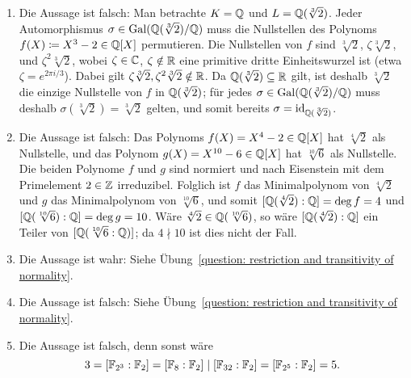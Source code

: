 \begin{solution}
  \begin{enumerate}
    \item
      Die Aussage ist falsch:
      Man betrachte $K = \mathbb{Q}$ und $L = \mathbb{Q}(\sqrt[3]{2})$.
      Jeder Automorphismus $\sigma \in \operatorname{Gal}(\mathbb{Q}(\sqrt[3]{2})/\mathbb{Q})$ muss die Nullstellen des Polynoms $f(X) \coloneqq X^3-2 \in \mathbb{Q}[X]$ permutieren.
      Die Nullstellen von $f$ sind $\sqrt[3]{2}$, $\zeta \sqrt[3]{2}$, und $\zeta^2 \sqrt[3]{2}$, wobei $\zeta \in \mathbb{C}$, $\zeta \notin \mathbb{R}$ eine primitive dritte Einheitswurzel ist (etwa $\zeta = e^{2 \pi i/3}$).
      Dabei gilt $\zeta \sqrt[3]{2}, \zeta^2 \sqrt[3]{2} \notin \mathbb{R}$.
      Da $\mathbb{Q}(\sqrt[3]{2}) \subseteq \mathbb{R}$ gilt, ist deshalb $\sqrt[3]{2}$ die einzige Nullstelle von $f$ in $\mathbb{Q}(\sqrt[3]{2})$;
      für jedes $\sigma \in \operatorname{Gal}(\mathbb{Q}(\sqrt[3]{2})/\mathbb{Q})$ muss deshalb $\sigma(\sqrt[3]{2}) = \sqrt[3]{2}$ gelten, und somit bereits $\sigma = \operatorname{id}_{\mathbb{Q}(\sqrt[3]{2})}$.
      
    \item
      Die Aussage ist falsch:
      Das Polynoms $f(X) = X^4 - 2 \in \mathbb{Q}[X]$ hat $\sqrt[4]{2}$ als Nullstelle, und das Polynom $g(X) = X^{10} - 6 \in \mathbb{Q}[X]$ hat $\sqrt[10]{6}$ als Nullstelle.
      Die beiden Polynome $f$ und $g$ sind normiert und nach Eisenstein mit dem Primelement $2 \in \mathbb{Z}$ irreduzibel.
      Folglich ist $f$ das Minimalpolynom von $\sqrt[4]{2}$ und $g$ das Minimalpolynom von $\sqrt[10]{6}$, und somit $[\mathbb{Q}(\sqrt[4]{2}) : \mathbb{Q}] = \deg f = 4$ und $[\mathbb{Q}(\sqrt[10]{6}) : \mathbb{Q}] = \deg g = 10$.
      Wäre $\sqrt[4]{2} \in \mathbb{Q}(\sqrt[10]{6})$, so wäre $[\mathbb{Q}(\sqrt[4]{2}) : \mathbb{Q}]$ ein Teiler von $[\mathbb{Q}(\sqrt[10]{6} : \mathbb{Q})]$; da $4 \nmid 10$ ist dies nicht der Fall.
      
    \item
      Die Aussage ist wahr:
      Siehe Übung~\ref{question: restriction and transitivity of normality}.
      
    \item
      Die Aussage ist falsch:
      Siehe Übung~\ref{question: restriction and transitivity of normality}.
      
    \item
      Die Aussage ist falsch, denn sonst wäre
      \[
              3
        =     [\mathbb{F}_{2^3} : \mathbb{F}_2]
        =     [\mathbb{F}_8 : \mathbb{F}_2]
        \mid  [\mathbb{F}_{32} : \mathbb{F}_2]
        =     [\mathbb{F}_{2^5} : \mathbb{F}_2]
        =     5.
      \]
      

\end{enumerate}
\end{solution}
